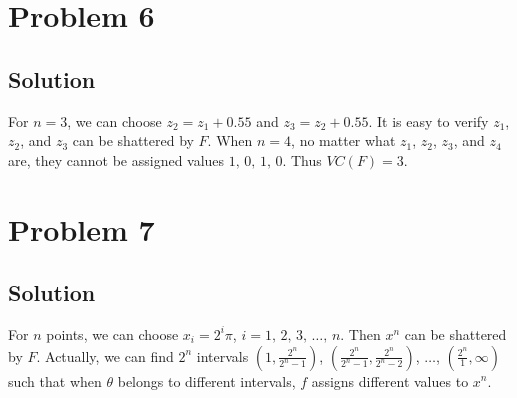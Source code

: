 \documentclass[11pt]{report}
\begin{document}
\section*{Problem 6}
\subsection*{Solution}
For $n = 3$, we can choose $z_2 = z_1 + 0.55$ and $z_3 = z_2 + 0.55$. It is easy to verify $z_1$, $z_2$, and $z_3$ can be shattered by $F$. When $n = 4$, no matter what $z_1$, $z_2$, $z_3$, and $z_4$ are, they cannot be assigned values $1,\,0,\,1,\,0$. Thus $VC(F) = 3$.
\section*{Problem 7}
\subsection*{Solution}
For $n$ points, we can choose $x_i = 2^i \pi$, $i=1,\,2,\,3,\,\dots,\,n$. Then $x^n$ can be shattered by $F$. Actually, we can find $2^n$ intervals $(1, \frac{2^n}{2^n-1})$, $(\frac{2^n}{2^n-1}, \frac{2^n}{2^n-2})$, $\dots$, $(\frac{2^n}{1}, \infty)$ such that when $\theta$ belongs to different intervals, $f$ assigns different values to $x^n$.
\end{document}
